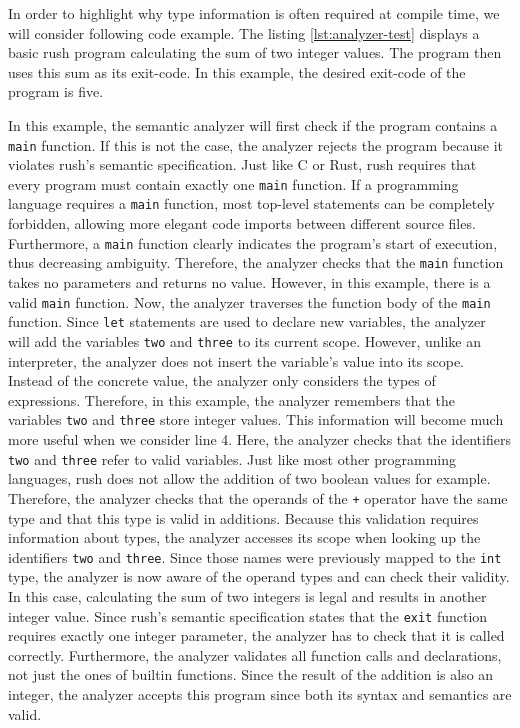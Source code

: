 In order to highlight why type information is often required at compile time, we
will consider following code example. The listing \ref{lst:analyzer-test} displays a basic rush program
calculating the sum of two integer values.
The program then uses this sum as its exit-code.
In this example, the desired exit-code of the program is five.


In this example, the semantic analyzer will first check if the program contains
a \texttt{main} function. If this is not the case, the analyzer rejects the program
because it violates rush's semantic specification. Just like C or Rust, rush
requires that every program must contain exactly one \texttt{main} function. If a
programming language requires a \texttt{main} function, most top-level statements can be
completely forbidden, allowing more elegant code imports between different
source files. Furthermore, a \texttt{main} function clearly indicates the program's
start of execution, thus decreasing ambiguity. Therefore, the analyzer checks that
the \texttt{main} function takes no parameters and returns no value. However, in this
example, there is a valid \texttt{main} function. Now, the analyzer traverses the
function body of the \texttt{main} function. Since \texttt{let} statements are used to declare
new variables, the analyzer will add the variables \texttt{two} and \texttt{three} to its
current scope. However, unlike an interpreter, the analyzer does not insert the
variable's value into its scope. Instead of the concrete value, the analyzer
only considers the types of expressions. Therefore, in this example, the
analyzer remembers that the variables \texttt{two} and \texttt{three} store integer values.
This information will become much more useful when we consider line 4. Here, the
analyzer checks that the identifiers \texttt{two} and \texttt{three} refer to valid variables.
Just like most other programming languages, rush does not allow the addition
of two boolean values for example. Therefore, the analyzer checks that the operands
of the \texttt{+} operator have the same type and that this type is valid in additions.
Because this validation requires information about types, the analyzer accesses
its scope when looking up the identifiers \texttt{two} and \texttt{three}. Since those names
were previously mapped to the \texttt{int} type, the analyzer is now aware of the
operand types and can check their validity. In this case, calculating the
sum of two integers is legal and results in another integer value. Since rush's
semantic specification states that the \texttt{exit} function requires exactly one
integer parameter, the analyzer has to check that it is called correctly.
Furthermore, the analyzer validates all function calls and declarations, not
just the ones of builtin functions. Since the result of the addition is also an
integer, the analyzer accepts this program since both its syntax and semantics
are valid.

